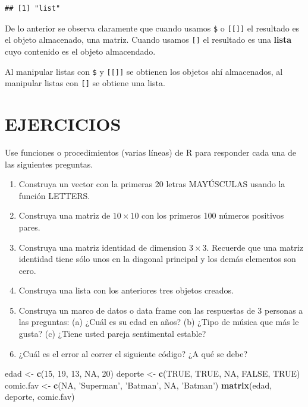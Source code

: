 \documentclass[10pt,]{krantz}
\makeatletter
\newenvironment{Shaded}{\begin{snugshade}}{\end{snugshade}}
\newcommand{\KeywordTok}[1]{\textcolor[rgb]{0.13,0.29,0.53}{\textbf{#1}}}
\newcommand{\DecValTok}[1]{\textcolor[rgb]{0.00,0.00,0.81}{#1}}
\newcommand{\StringTok}[1]{\textcolor[rgb]{0.31,0.60,0.02}{#1}}
\newcommand{\OtherTok}[1]{\textcolor[rgb]{0.56,0.35,0.01}{#1}}
\newcommand{\NormalTok}[1]{#1}
\newenvironment{kframe}{%
\medskip{}
\setlength{\fboxsep}{.8em}
 \def\at@end@of@kframe{}%
 \ifinner\ifhmode%
  \def\at@end@of@kframe{\end{minipage}}%
  \begin{minipage}{\columnwidth}%
 \fi\fi%
 \def\FrameCommand##1{\hskip\@totalleftmargin \hskip-\fboxsep
 \colorbox{shadecolor}{##1}\hskip-\fboxsep
     \hskip-\linewidth \hskip-\@totalleftmargin \hskip\columnwidth}%
 \MakeFramed {\advance\hsize-\width
   \@totalleftmargin\z@ \linewidth\hsize
   \@setminipage}}%
 {\par\unskip\endMakeFramed%
 \at@end@of@kframe}
\renewenvironment{Shaded}{\begin{kframe}}{\end{kframe}}
\let\BeginKnitrBlock\begin \let\EndKnitrBlock\end
\makeatother
\begin{document}
\begin{verbatim}
## [1] "list"
\end{verbatim}

De lo anterior se observa claramente que cuando usamos \texttt{\$} o
\texttt{{[}{[}{]}{]}} el resultado es el objeto almacenado, una matriz.
Cuando usamos \texttt{{[}{]}} el resultado es una \textbf{lista} cuyo
contenido es el objeto almacendado.

\BeginKnitrBlock{rmdwarning}
Al manipular listas con \texttt{\$} y \texttt{{[}{[}{]}{]}} se obtienen
los objetos ahí almacenados, al manipular listas con \texttt{{[}{]}} se
obtiene una lista.
\EndKnitrBlock{rmdwarning}

\section*{EJERCICIOS}\label{ejercicios}


Use funciones o procedimientos (varias líneas) de R para responder cada
una de las siguientes preguntas.

\begin{enumerate}
\def\labelenumi{\arabic{enumi}.}
\item
  Construya un vector con la primeras 20 letras MAYÚSCULAS usando la
  función LETTERS.
\item
  Construya una matriz de \(10 \times 10\) con los primeros 100 números
  positivos pares.
\item
  Construya una matriz identidad de dimension \(3 \times 3\). Recuerde
  que una matriz identidad tiene sólo unos en la diagonal principal y
  los demás elementos son cero.
\item
  Construya una lista con los anteriores tres objetos creados.
\item
  Construya un marco de datos o data frame con las respuestas de 3
  personas a las preguntas: (a) ¿Cuál es su edad en años? (b) ¿Tipo de
  música que más le gusta? (c) ¿Tiene usted pareja sentimental estable?
\item
  ¿Cuál es el error al correr el siguiente código? ¿A qué se debe?
\end{enumerate}

\begin{Shaded}
\begin{Highlighting}[]
\NormalTok{edad <-}\StringTok{ }\KeywordTok{c}\NormalTok{(}\DecValTok{15}\NormalTok{, }\DecValTok{19}\NormalTok{, }\DecValTok{13}\NormalTok{, }\OtherTok{NA}\NormalTok{, }\DecValTok{20}\NormalTok{)}
\NormalTok{deporte <-}\StringTok{ }\KeywordTok{c}\NormalTok{(}\OtherTok{TRUE}\NormalTok{, }\OtherTok{TRUE}\NormalTok{, }\OtherTok{NA}\NormalTok{, }\OtherTok{FALSE}\NormalTok{, }\OtherTok{TRUE}\NormalTok{)}
\NormalTok{comic.fav <-}\StringTok{ }\KeywordTok{c}\NormalTok{(}\OtherTok{NA}\NormalTok{, }\StringTok{'Superman'}\NormalTok{, }\StringTok{'Batman'}\NormalTok{, }\OtherTok{NA}\NormalTok{, }\StringTok{'Batman'}\NormalTok{)}
\KeywordTok{matrix}\NormalTok{(edad, deporte, comic.fav)}
\end{Highlighting}
\end{Shaded}
\end{document}
